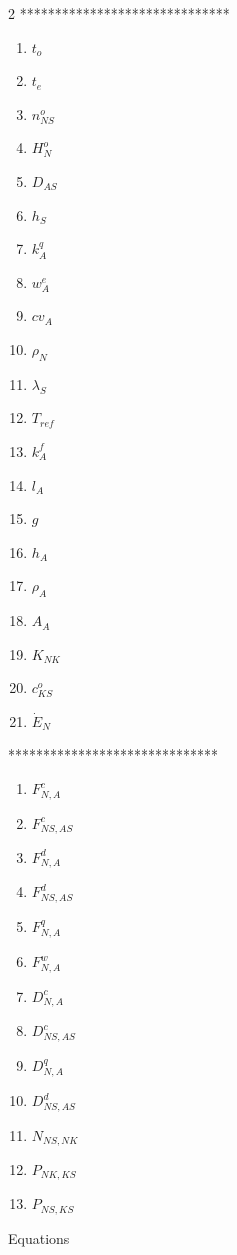 \documentclass[10pt,a4paper]{report}
\begin{document}
\begin{multicols}{2}
		******************************
		\begin{enumerate}[resume]
			\item $t_o$
			\item $t_e$
			\item $n^{o}_{NS}$
			\item $H^o_N$
			\item $D_{AS}$
			\item $h_S$
			\item $k^q_A$
			\item $w^e_A$			
			\item $cv_A$			
			\item $\rho_N$			
			\item $\lambda_S$
			\item $T_{ref}$					
			\item $k^{f}_A$
			\item $l_A$
			\item $g$
			\item $h_A$			
			\item $\rho_A$
			\item $A_A$			
			\item $K_{NK}$			
			\item $c^{o}_{KS}$
			\item $\dot{E}_N$	
		\end{enumerate}
		******************************
		\begin{enumerate}[resume]
			\item $F^{c}_{N, A}$
			\item $F^{c}_{NS,AS}$
			\item $F^{d}_{N, A}$
			\item $F^{d}_{NS,AS}$			
			\item $F^{q}_{N, A}$
			\item $F^{w}_{N, A}$			
			\item $D^{c}_{N, A}$
			\item $D^{c}_{NS, AS}$
			\item $D^{q}_{N, A}$
			\item $D^{d}_{NS, AS}$
			\item $N_{NS, NK}$
			\item $P_{NK, KS}$
			\item $P_{NS, KS}$						
		\end{enumerate}
	\end{multicols}	
	\newpage
	\Large{Equations}
\end{document}
